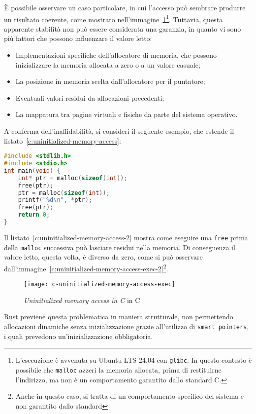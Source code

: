 È possibile osservare un caso particolare, in cui l'accesso può sembrare produrre un risultato coerente, come mostrato nell'immagine~\ref{c:uninitialized-memory-access-exec}\footnote{L'esecuzione è avvenuta su Ubuntu LTS 24.04 con \texttt{glibc}. In questo contesto è possibile che \texttt{malloc} azzeri la memoria allocata, prima di restituirne l'indirizzo, ma non è un comportamento garantito dallo standard C.}.
Tuttavia, questa apparente stabilità non può essere considerata una garanzia, in quanto vi sono più fattori che possono influenzare il valore letto:
\begin{itemize}
    \item Implementazioni specifiche dell'allocatore di memoria, che possono inizializzare la memoria allocata a zero o a un valore casuale;
    \item La posizione in memoria scelta dall'allocatore per il puntatore;
    \item Eventuali valori residui da allocazioni precedenti;
    \item La mappatura tra pagine virtuali e fisiche da parte del sistema operativo.
\end{itemize}
A conferma dell'inaffidabilità, si consideri il seguente esempio, che estende il listato~\ref{c:uninitialized-memory-access}: 
\begin{lstlisting}[language=C, caption={Uninitialized memory access in C}, label={c:uninitialized-memory-access-2}]
#include <stdlib.h>
#include <stdio.h>
int main(void) {
    int* ptr = malloc(sizeof(int));
    free(ptr);
    ptr = malloc(sizeof(int));
    printf("%d\n", *ptr);
    free(ptr);
    return 0;
}
\end{lstlisting}
Il listato~\ref{c:uninitialized-memory-access-2} mostra come eseguire una \texttt{free} prima della \texttt{malloc} successiva può lasciare residui nella memoria. 
Di conseguenza il valore letto, questa volta, è diverso da zero, come si può osservare dall'immagine~\ref{c:uninitialized-memory-access-exec-2}\footnote{Anche in questo caso, si tratta di un comportamento specifico del sistema e non garantito dallo standard}.
\begin{figure}[htbp]
\begin{center}
    \texttt{[image: c-uninitialized-memory-access-exec]}
    \caption{\textit{Uninitialized memory access in C} in C}\label{c:uninitialized-memory-access-exec}
    \end{center}
\end{figure}
Rust previene questa problematica in maniera strutturale, non permettendo allocazioni dinamiche senza inizializzazione grazie all'utilizzo di \texttt{smart pointers}, i quali prevedono un'inizializzazione obbligatoria.

